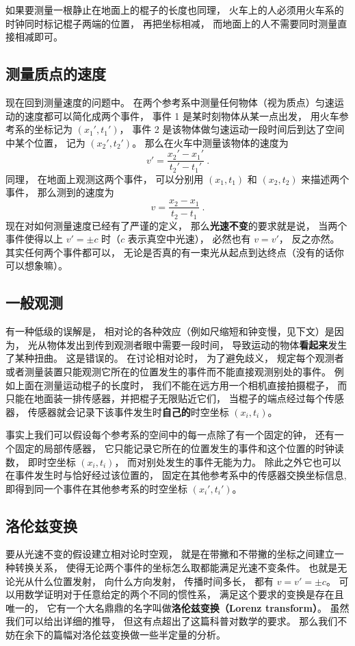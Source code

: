 如果要测量一根静止在地面上的棍子的长度也同理， 火车上的人必须用火车系的时钟同时标记棍子两端的位置， 再把坐标相减， 而地面上的人不需要同时测量直接相减即可。

\subsection{测量质点的速度}
现在回到测量速度的问题中。 在两个参考系中测量任何物体（视为质点）匀速运动的速度都可以简化成两个事件， 事件 1 是某时刻物体从某一点出发， 用火车参考系的坐标记为 $(x_1', t_1')$， 事件 2 是该物体做匀速运动一段时间后到达了空间中某个位置， 记为 $(x_2', t_2')$。 那么在火车中测量该物体的速度为
\begin{equation} \label{eq_Relat0_2}
v' = \frac{x_2' - x_1'}{t_2' - t_1'}~.
\end{equation}
同理， 在地面上观测这两个事件， 可以分别用 $(x_1, t_1)$ 和 $(x_2, t_2)$ 来描述两个事件， 那么测到的速度为
\begin{equation} \label{eq_Relat0_1}
v = \frac{x_2 - x_1}{t_2 - t_1}~.
\end{equation}
现在对如何测量速度已经有了严谨的定义， 那么\textbf{光速不变}的要求就是说， 当两个事件使得以上 $v' = \pm c$ 时（$c$ 表示真空中光速）， 必然也有 $v = v'$， 反之亦然。 其实任何两个事件都可以， 无论是否真的有一束光从起点到达终点（没有的话你可以想象嘛）。

\subsection{一般观测}
有一种低级的误解是， 相对论的各种效应（例如尺缩短和钟变慢，见下文）是因为， 光从物体发出到传到观测者眼中需要一段时间， 导致运动的物体\textbf{看起来}发生了某种扭曲。 这是错误的。 在讨论相对论时， 为了避免歧义， 规定每个观测者或者测量装置只能观测它所在的位置发生的事件而不能直接观测别处的事件。 例如上面在测量运动棍子的长度时， 我们不能在远方用一个相机直接拍摄棍子， 而只能在地面装一排传感器，并把棍子无限贴近它们， 当棍子的端点经过每个传感器， 传感器就会记录下该事件发生时\textbf{自己的}时空坐标 $(x_i, t_i)$。

事实上我们可以假设每个参考系的空间中的每一点除了有一个固定的钟， 还有一个固定的局部传感器， 它只能记录它所在的位置发生的事件和这个位置的时钟读数， 即时空坐标 $(x_i, t_i)$， 而对别处发生的事件无能为力。 除此之外它也可以在事件发生时与恰好经过该位置的， 固定在其他参考系中的传感器交换坐标信息, 即得到同一个事件在其他参考系的时空坐标 $(x_i', t_i')$。

\subsection{洛伦兹变换}
要从光速不变的假设建立相对论时空观， 就是在带撇和不带撇的坐标之间建立一种转换关系， 使得无论两个事件的坐标怎么取都能满足光速不变条件。 也就是无论光从什么位置发射， 向什么方向发射， 传播时间多长， 都有 $v = v' = \pm c$。 可以用数学证明对于任意给定的两个不同的惯性系， 满足这个要求的变换是存在且唯一的， 它有一个大名鼎鼎的名字叫做\textbf{洛伦兹变换（Lorenz transform）}。 虽然我们可以给出详细的推导， 但这有点超出了这篇科普对数学的要求。 那么我们不妨在余下的篇幅对洛伦兹变换做一些半定量的分析。


